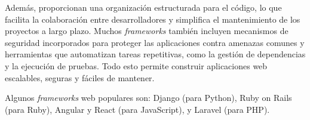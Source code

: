 Además, proporcionan una organización estructurada para el código, lo que facilita la colaboración entre desarrolladores y simplifica el mantenimiento de los proyectos a largo plazo. Muchos \textit{frameworks} también incluyen mecanismos de seguridad incorporados para proteger las aplicaciones contra amenazas comunes y herramientas que automatizan tareas repetitivas, como la gestión de dependencias y la ejecución de pruebas. Todo esto permite construir aplicaciones web escalables, seguras y fáciles de mantener.

Algunos \textit{frameworks} web populares son: Django (para Python), Ruby on Rails (para Ruby), Angular y React (para JavaScript), y Laravel (para PHP).

%
%
%
%
%
%
%
%
%
%
%
%
%
%
